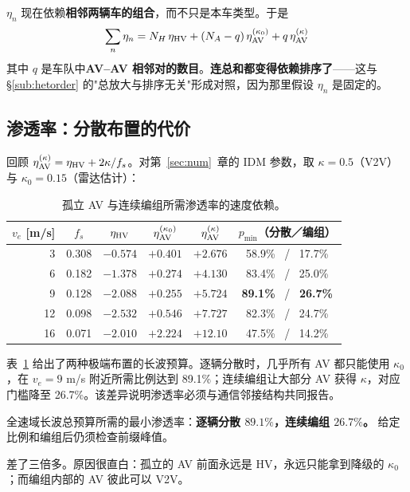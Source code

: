 \documentclass[11pt,a4paper,openany]{book}
\numberwithin{equation}{chapter}
\numberwithin{figure}{chapter}
\numberwithin{table}{chapter}
\begin{document}
\begin{tcolorbox}[notebox,title=\textbf{这带来一个结构性的新效应}]
$\eta_n$ 现在依赖\textbf{相邻两辆车的组合}，而不只是本车类型。于是
\[
\sum_{n}\eta_n = N_H\,\eta_{\rm HV} + \left(N_A-q\right)\eta_{\rm AV}^{(\kappa_0)} + q\,\eta_{\rm AV}^{(\kappa)}
\]
其中 $q$ 是车队中\textbf{AV--AV 相邻对的数目}。\textbf{连总和都变得依赖排序了}——这与 \S\ref{sub:hetorder} 的"总放大与排序无关"形成对照，因为那里假设 $\eta_n$ 是固定的。
\end{tcolorbox}

\subsection{渗透率：分散布置的代价}

回顾 $\eta_{\rm AV}^{(\kappa)} = \eta_{\rm HV} + 2\kappa/f_s$。对第~\ref{sec:num}~章的 IDM 参数，取 $\kappa=0.5$（V2V）与 $\kappa_0=0.15$（雷达估计）：

\begin{table}[htbp]
\centering
\caption{孤立 AV 与连续编组所需渗透率的速度依赖。}
\label{tab:dispersed-versus-grouped-pmin}
\begin{tabular}{rccccc}
\toprule
$v_e$ [m/s] & $f_s$ & $\eta_{\rm HV}$ & $\eta_{\rm AV}^{(\kappa_0)}$ & $\eta_{\rm AV}^{(\kappa)}$ & $p_{\min}$（分散／编组） \\
\midrule
3  & 0.308 & $-0.574$ & $+0.401$ & $+2.676$ & 58.9\% \ / \ 17.7\% \\
6  & 0.182 & $-1.378$ & $+0.274$ & $+4.130$ & 83.4\% \ / \ 25.0\% \\
9  & 0.128 & $-2.088$ & $+0.255$ & $+5.724$ & \textbf{89.1\%} \ / \ \textbf{26.7\%} \\
12 & 0.098 & $-2.532$ & $+0.546$ & $+7.727$ & 82.3\% \ / \ 24.7\% \\
16 & 0.071 & $-2.010$ & $+2.224$ & $+12.10$ & 47.5\% \ / \ 14.2\% \\
\bottomrule
\end{tabular}
\end{table}

表~\ref{tab:dispersed-versus-grouped-pmin} 给出了两种极端布置的长波预算。逐辆分散时，几乎所有 AV 都只能使用 $\kappa_0$，在 $v_e=9$ m/s 附近所需比例达到 89.1\%；连续编组让大部分 AV 获得 $\kappa$，对应门槛降至 26.7\%。该差异说明渗透率必须与通信邻接结构共同报告。

\begin{tcolorbox}[keybox,title=\textbf{核心数字}]
全速域长波总预算所需的最小渗透率：\textbf{逐辆分散 $89.1\%$，连续编组 $26.7\%$。} 给定比例和编组后仍须检查前缀峰值。

差了三倍多。原因很直白：孤立的 AV 前面永远是 HV，永远只能拿到降级的 $\kappa_0$；而编组内部的 AV 彼此可以 V2V。
\end{tcolorbox}
\end{document}
